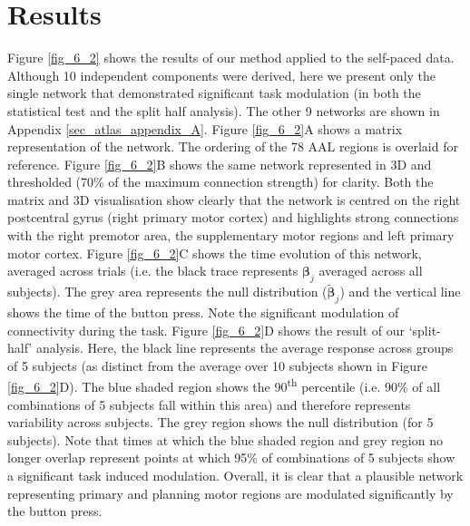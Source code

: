 \section{Results}\label{sec_atlas_results}
Figure \ref{fig_6_2} shows the results of our method applied to the self-paced data. Although 10 independent components were derived, here we present only the single network that demonstrated significant task modulation (in both the statistical test and the split half analysis). The other 9 networks are shown in Appendix \ref{sec_atlas_appendix_A}. Figure \ref{fig_6_2}A shows a matrix representation of the network. The ordering of the 78 AAL regions is overlaid for reference. Figure \ref{fig_6_2}B shows the same network represented in 3D and thresholded (70\% of the maximum connection strength) for clarity. Both the matrix and 3D visualisation show clearly that the network is centred on the right postcentral gyrus (right primary motor cortex) and highlights strong connections with the right premotor area, the supplementary motor regions and left primary motor cortex. Figure \ref{fig_6_2}C shows the time evolution of this network, averaged across trials (i.e. the black trace represents $\mathbf{β}_j$ averaged across all subjects). The grey area represents the null distribution ($\tilde{\mathbf{β}}_j$) and the vertical line shows the time of the button press. Note the significant modulation of connectivity during the task. Figure \ref{fig_6_2}D shows the result of our ‘split-half’ analysis. Here, the black line represents the average response across groups of 5 subjects (as distinct from the average over 10 subjects shown in Figure \ref{fig_6_2}D). The blue shaded region shows the 90\textsuperscript{th} percentile (i.e. 90\% of all combinations of 5 subjects fall within this area) and therefore represents variability across subjects. The grey region shows the null distribution (for 5 subjects). Note that times at which the blue shaded region and grey region no longer overlap represent points at which 95\% of combinations of 5 subjects show a significant task induced modulation. Overall, it is clear that a plausible network representing primary and planning motor regions are modulated significantly by the button press.

